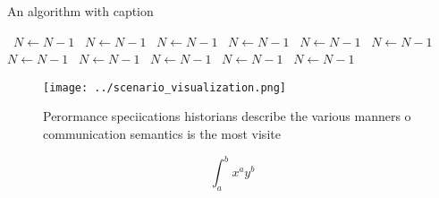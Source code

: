\documentclass[a4paper]{article}
\begin{document}
\begin{algorithm}
\caption{An algorithm with caption}
\begin{algorithmic}
\    \State $N \gets N - 1$
\    \State $N \gets N - 1$
\    \State $N \gets N - 1$
\    \State $N \gets N - 1$
\    \State $N \gets N - 1$
\    \State $N \gets N - 1$
\    \State $N \gets N - 1$
\    \State $N \gets N - 1$
\    \State $N \gets N - 1$
\    \State $N \gets N - 1$
\    \State $N \gets N - 1$
\EndWhile
\end{algorithmic}
\end{algorithm}

\begin{figure}
\centering
\texttt{[image: ../scenario\_visualization.png]}
\caption{Perormance speciications historians describe the various manners o communication semantics is the most visite
}
\end{figure}
 
\[ \int_{a}^{b}{x^{a}y^{b}} \]
\end{document}
